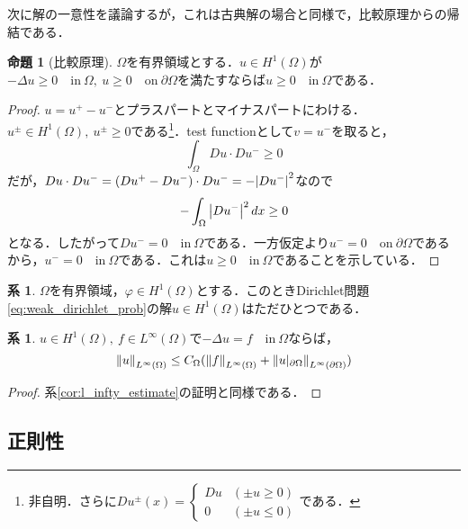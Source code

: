 \documentclass[a4paper]{ltjsarticle}
\newcommand{\Om}{\Omega}
\newcommand{\pOm}{\partial\Omega}
\newcommand{\inn}{\quad\text{in}\ }
\newcommand{\on}{\quad \text{on}\ }
\newcommand{\1}{\mathbbm{1}}
\numberwithin{equation}{section}
\theoremstyle{definition}
\newtheorem{cor}[thm]{系}
\newtheorem{prop}[thm]{命題}
\begin{document}
次に解の一意性を議論するが，これは古典解の場合と同様で，比較原理からの帰結である．
\begin{prop}[比較原理]
    $\Om$を有界領域とする．$u\in H^1(\Om)$が$-\Delta u\geq0\inn \Om,\ u\geq0\on \pOm$を満たすならば$u\geq0\inn\Om$である．    
\end{prop}
\begin{proof}
    $u=u^{+}-u^{-}$とプラスパートとマイナスパートにわける．$u^{\pm}\in H^1(\Om),\ u^{\pm}\geq0$である\footnote{非自明．さらに$Du^{\pm}(x)=\begin{cases}
        Du & (\pm u\geq0)\\
        0 & (\pm u\leq 0)
    \end{cases}$である．}．test functionとして$v=u^{-}$を取ると，
    \begin{equation}
        \int_{\Om}Du\cdot Du^{-}\geq0 
    \end{equation}
    だが，$Du\cdot Du^{-}=(Du^{+}-Du^{-})\cdot Du^{-}=-\abs{Du^-}^2$なので
    \begin{equation}
        -\int_{\Om}\abs{Du^{-}}^2\,dx\geq0 
    \end{equation}
    となる．したがって$Du^{-}=0\inn\Om$である．一方仮定より$u^{-}=0\on\pOm$であるから，$u^{-}=0\inn\Om$である．これは$u\geq0\inn\Om$であることを示している．
\end{proof}
\begin{cor}
    $\Om$を有界領域，$\varphi\in H^1(\Om)$とする．このときDirichlet問題\eqref{eq:weak_dirichlet_prob}の解$u\in H^1(\Om)$はただひとつである．
\end{cor}
\begin{cor}\label{cor:weak_l_infty_estimate}
    $u\in H^1(\Om),\ f\in L^\infty(\Om)$で$-\Delta u=f\inn \Om$ならば，
    \begin{equation}
        \norm{u}_{L^\infty(\Om)}\leq C_{\Om}(\norm{f}_{L^\infty(\Om)}+\norm{u|_{\pOm}}_{L^{\infty}(\pOm)})
    \end{equation}
\end{cor}
\begin{proof}
    系\ref{cor:l_infty_estimate}の証明と同様である．
\end{proof}
\subsection{正則性}
\end{document}
